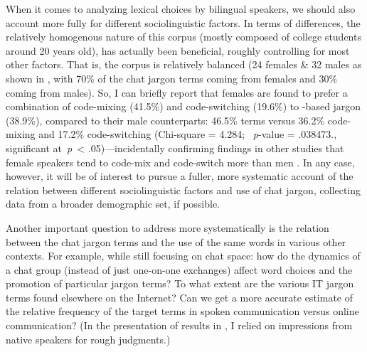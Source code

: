 \documentclass[output=paper
,newtxmath
,modfonts
,nonflat]{langsci/langscibook}
\begin{document}
When it comes to analyzing lexical choices by bilingual speakers, we should also account more fully for different sociolinguistic factors. In terms of  differences, the relatively homogenous nature of this corpus (mostly composed of college students around 20 years old), has actually been beneficial, roughly controlling for most other factors. That is, the corpus is relatively balanced (24 females \& 32 males as shown in , with 70\% of the chat jargon terms coming from females and 30\% coming from males). So, I can briefly report that females are found to prefer a combination of code-mixing (41.5\%) and code-switching (19.6\%) to -based jargon (38.9\%), compared to their male counterparts: 46.5\%  terms versus 36.2\%  code-mixing and 17.2\% code-switching (Chi-square = 4.284; ~\textit{p}{}-value = .038473., significant at~\textit{p}~< .05)—incidentally confirming findings in other studies that female speakers tend to code-mix and code-switch more than men \citep{ahmeh2015,hamdani2012,wong2006}. In any case, however, it will be of interest to pursue a fuller, more systematic account of the relation between different sociolinguistic factors and use of chat jargon, collecting data from a broader demographic set, if possible. 

Another important question to address more systematically is the relation between the chat jargon terms and the use of the same words in various other contexts. For example, while still focusing on chat space: how do the dynamics of a chat group (instead of just one-on-one exchanges) affect word choices and the promotion of particular jargon terms? To what extent are the various IT jargon terms found elsewhere on the Internet? Can we get a more accurate estimate of the relative frequency of the target terms in spoken communication versus online communication? (In the presentation of results in , I relied on impressions from native speakers for rough judgments.) 
\end{document}
